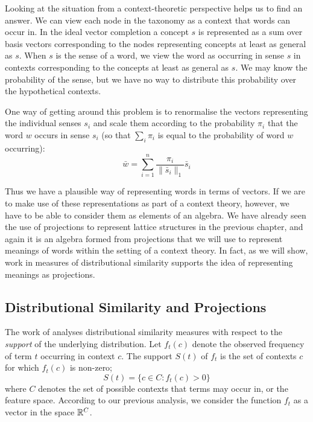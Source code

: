 \documentclass{report}
\begin{document}
Looking at the situation from a context-theoretic perspective helps us to find an answer. We can view each node in the taxonomy as a context that words can occur in. In the ideal vector completion a concept $s$ is represented as a sum over basis vectors corresponding to the nodes representing concepts at least as general as $s$. When $s$ is the sense of a word, we view the word as occurring in sense $s$ in contexts corresponding to the concepts at least as general as $s$. We may know the probability of the sense, but we have no way to distribute this probability over the hypothetical contexts.

One way of getting around this problem is to renormalise the vectors representing the individual senses $s_i$ and scale them according to the probability $\pi_i$ that the word $w$ occurs in sense $s_i$ (so that $\sum_i \pi_i$ is equal to the probability of word $w$ occurring):
$$\bar{w} = \sum_{i=1}^n \frac{\pi_i}{\|\bar{s}_i\|_1}\bar{s}_i$$


Thus we have a plausible way of representing words in terms of vectors. If we are to make use of these representations as part of a context theory, however, we have to be able to consider them as elements of an algebra. We have already seen the use of projections to represent lattice structures in the previous chapter, and again it is an algebra formed from projections that we will use to represent meanings of words within the setting of a context theory. In fact, as we will show, work in measures of distributional similarity supports the idea of representing meanings as projections.

\subsection{Distributional Similarity and Projections}

The work of \cite{Lee:99} analyses distributional similarity measures with respect to the \emph{support} of the underlying distribution. Let $f_t(c)$ denote the observed frequency of term $t$ occurring in context $c$. The support $S(t)$ of $f_t$ is the set of contexts $c$ for which $f_t(c)$ is non-zero;
$$S(t) = \{c \in C : f_t(c) > 0\}$$
where $C$ denotes the set of possible contexts that terms may occur in, or the feature space. According to our previous analysis, we consider the function $f_t$ as a vector in the space $\mathbb{R}^C$.
\end{document}
